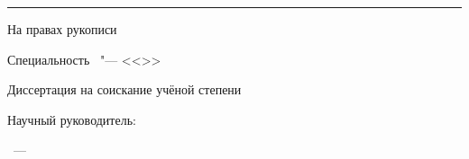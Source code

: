 

\thispagestyle{empty}
\begin{center}
	\thesisFirstOrganization
		
	\ifdefined\thesisSecondOrganization
		\thesisSecondOrganization
	\fi
		
	\rule{\linewidth}{1pt}
\end{center}


\vspace{0pt plus4fill} 
\begin{flushright}
	На правах рукописи
\end{flushright}


\vspace{0pt plus6fill} 
\begin{center}
	{\large \thesisAuthor}
\end{center}


\vspace{0pt plus1fill} 
\begin{center}
	\textbf {\large \MakeUppercase \thesisTitle}
	
	\vspace{0pt plus2fill} 
	Специальность \thesisSpecialtyNumber\ "--- <<\thesisSpecialtyTitle>>
	
	\vspace{0pt plus2fill} 
	Диссертация на соискание учёной степени
	
	\thesisDegree
\end{center}


\vspace{0pt plus4fill} 
\begin{flushright}
	Научный руководитель:

	\supervisorRegalia

	\ifdefined\supervisorDead
		\framebox{\supervisorFio}
	\else
		\supervisorFio
	\fi
\end{flushright}


\vspace{0pt plus4fill} 
{\centering\thesisCity~---~\thesisYear\par}
